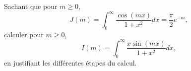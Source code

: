 

\begin{exercice}\label{exo_I-3-7}

Sachant que pour $m\geq0$,
\begin{equation}
	J(m)=\int_0^{\infty}\frac{ \cos(mx) }{ 1+x^2 }dx=\frac{ \pi }{2} e^{-m},
\end{equation}
calculer pour $m\geq 0$,
\begin{equation}
	I(m)=\int_0^{\infty}\frac{ x\sin(mx) }{ 1+x^2 }dx,
\end{equation}
en justifiant les différentes étapes du calcul.

\end{exercice}
